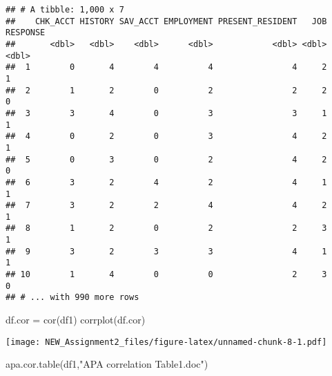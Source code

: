 \documentclass[
]{article}
\newenvironment{Shaded}{\begin{snugshade}}{\end{snugshade}}
\newcommand{\FunctionTok}[1]{\textcolor[rgb]{0.00,0.00,0.00}{#1}}
\newcommand{\NormalTok}[1]{#1}
\newcommand{\OtherTok}[1]{\textcolor[rgb]{0.56,0.35,0.01}{#1}}
\newcommand{\StringTok}[1]{\textcolor[rgb]{0.31,0.60,0.02}{#1}}
\begin{document}
\begin{verbatim}
## # A tibble: 1,000 x 7
##    CHK_ACCT HISTORY SAV_ACCT EMPLOYMENT PRESENT_RESIDENT   JOB RESPONSE
##       <dbl>   <dbl>    <dbl>      <dbl>            <dbl> <dbl>    <dbl>
##  1        0       4        4          4                4     2        1
##  2        1       2        0          2                2     2        0
##  3        3       4        0          3                3     1        1
##  4        0       2        0          3                4     2        1
##  5        0       3        0          2                4     2        0
##  6        3       2        4          2                4     1        1
##  7        3       2        2          4                4     2        1
##  8        1       2        0          2                2     3        1
##  9        3       2        3          3                4     1        1
## 10        1       4        0          0                2     3        0
## # ... with 990 more rows
\end{verbatim}

\begin{Shaded}
\begin{Highlighting}[]
\NormalTok{df.cor }\OtherTok{=} \FunctionTok{cor}\NormalTok{(df1)}
\FunctionTok{corrplot}\NormalTok{(df.cor)}
\end{Highlighting}
\end{Shaded}

\texttt{[image: NEW\_Assignment2\_files/figure-latex/unnamed-chunk-8-1.pdf]}

\begin{Shaded}
\begin{Highlighting}[]
\FunctionTok{apa.cor.table}\NormalTok{(df1,}\StringTok{"APA correlation Table1.doc"}\NormalTok{)}
\end{Highlighting}
\end{Shaded}
\end{document}
